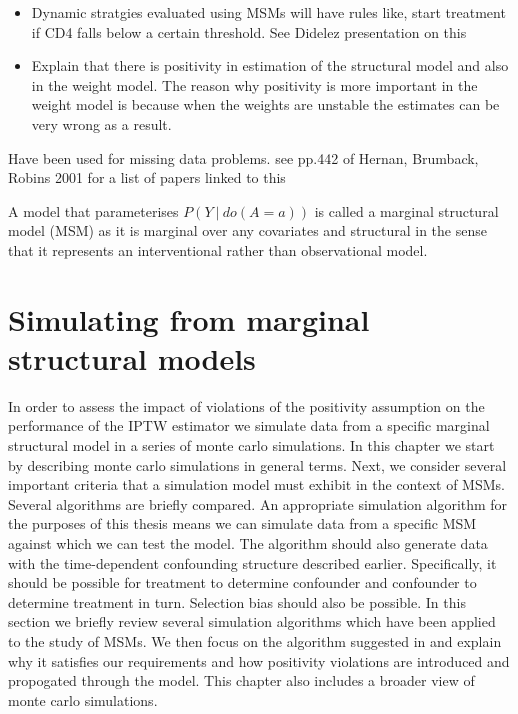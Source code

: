 \documentclass[11pt]{article}
\providecommand{\tightlist}{%
      \setlength{\itemsep}{0pt}\setlength{\parskip}{0pt}}
\begin{document}
\begin{itemize}
\tightlist
\item
  Dynamic stratgies evaluated using MSMs will have rules like, start
  treatment if CD4 falls below a certain threshold. See Didelez
  presentation on this
\item
  Explain that there is positivity in estimation of the structural model
  and also in the weight model. The reason why positivity is more
  important in the weight model is because when the weights are unstable
  the estimates can be very wrong as a result.
\end{itemize}

    Have been used for missing data problems. see pp.442 of Hernan,
Brumback, Robins 2001 for a list of papers linked to this

A model that parameterises \(P(Y\ |\ do(A=a))\) is called a marginal
structural model (MSM) as it is marginal over any covariates and
structural in the sense that it represents an interventional rather than
observational model.

    \newpage

    \section{Simulating from marginal structural
models}\label{simulating-from-marginal-structural-models}

In order to assess the impact of violations of the positivity assumption
on the performance of the IPTW estimator we simulate data from a
specific marginal structural model in a series of monte carlo
simulations. In this chapter we start by describing monte carlo
simulations in general terms. Next, we consider several important
criteria that a simulation model must exhibit in the context of MSMs.
Several algorithms are briefly compared. An appropriate simulation
algorithm for the purposes of this thesis means we can simulate data
from a specific MSM against which we can test the model. The algorithm
should also generate data with the time-dependent confounding structure
described earlier. Specifically, it should be possible for treatment to
determine confounder and confounder to determine treatment in turn.
Selection bias should also be possible. In this section we briefly
review several simulation algorithms which have been applied to the
study of MSMs. We then focus on the algorithm suggested in
\citet{Havercroft2010} and explain why it satisfies our requirements and
how positivity violations are introduced and propogated through the
model. This chapter also includes a broader view of monte carlo
simulations.
\end{document}
